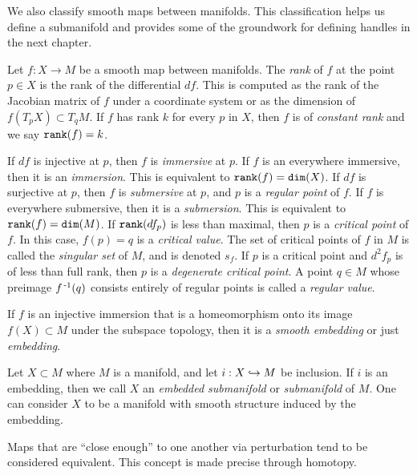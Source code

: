 We also classify smooth maps between manifolds.
This classification helps us define a submanifold and provides some of the groundwork for defining handles in the next chapter.

\begin{defn}[Embedding]
	Let $f:X\to M$ be a smooth map between manifolds.
	The \emph{rank} of $f$ at the point $p\in X$ is the rank of the differential $df$.
	This is computed as the rank of the Jacobian matrix of $f$ under a coordinate system or as the dimension of $f(T_p X)\subset T_q M$.
	If $f$ has rank $k$ for every $p$ in $X$, then $f$ is of \emph{constant rank} and we say $\texttt{rank}(f)=k$.
	
	If $df$ is injective at $p$, then $f$ is \emph{immersive} at $p$.
	If $f$ is an everywhere immersive, then it is an \emph{immersion}.
	This is equivalent to $\texttt{rank}(f)=\texttt{dim}(X)$.
	If $df$ is surjective at $p$, then $f$ is \emph{submersive} at $p$, and $p$ is a \emph{regular point} of $f$.
	If $f$ is everywhere submersive, then it is a \emph{submersion}.
	This is equivalent to $\texttt{rank}(f)=\texttt{dim}(M)$.
	If $\texttt{rank}(df_p)$ is less than maximal, then $p$ is a \emph{critical point} of $f$.
	In this case, $f(p)=q$ is a \emph{critical value}.
	The set of critical points of $f$ in $M$ is called the \emph{singular set} of $M$, and is denoted $s_f$.
	If $p$ is a critical point and $d^2f_p$ is of less than full rank, then $p$ is a \emph{degenerate critical point}.
	A point $q\in M$ whose preimage $f^{\,\text{-}1}(q)$ consists entirely of regular points is called a \emph{regular value}.
	
	If $f$ is an injective immersion that is a homeomorphism onto its image $f(X)\subset M$ under the subspace topology, then it is a \emph{smooth embedding} or just \emph{embedding}.
	
	Let $X\subset M$ where $M$ is a manifold, and let $i:X\hookrightarrow M$ be inclusion.
	If $i$ is an embedding, then we call $X$ an \emph{embedded submanifold} or \emph{submanifold} of $M$.
	One can consider $X$ to be a manifold with smooth structure induced by the embedding.
\end{defn}

Maps that are ``close enough'' to one another via perturbation tend to be considered equivalent.
This concept is made precise through homotopy.

